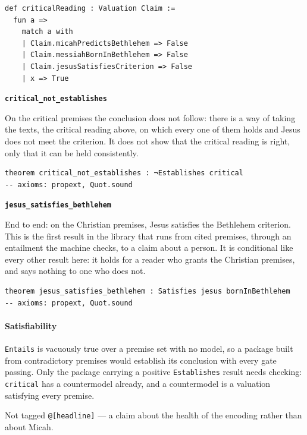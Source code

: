 \documentclass[11pt]{article}
\begin{document}
{\small\begin{verbatim}
def criticalReading : Valuation Claim :=
  fun a =>
    match a with
    | Claim.micahPredictsBethlehem => False
    | Claim.messiahBornInBethlehem => False
    | Claim.jesusSatisfiesCriterion => False
    | x => True
\end{verbatim}}
\par\medskip\noindent\textbf{\texttt{critical\_\allowbreak{}not\_\allowbreak{}establishes}}\par\nobreak\noindent
On the critical premises the conclusion does not follow: there is a way of taking the texts, the critical reading above, on which every one of them holds and Jesus does not meet the criterion. It does not show that the critical reading is right, only that it can be held consistently.

{\small\begin{verbatim}
theorem critical_not_establishes : ¬Establishes critical
-- axioms: propext, Quot.sound
\end{verbatim}}
\par\medskip\noindent\textbf{\texttt{jesus\_\allowbreak{}satisfies\_\allowbreak{}bethlehem}}\par\nobreak\noindent
End to end: on the Christian premises, Jesus satisfies the Bethlehem criterion. This is the first result in the library that runs from cited premises, through an entailment the machine checks, to a claim about a person. It is conditional like every other result here: it holds for a reader who grants the Christian premises, and says nothing to one who does not.

{\small\begin{verbatim}
theorem jesus_satisfies_bethlehem : Satisfies jesus bornInBethlehem
-- axioms: propext, Quot.sound
\end{verbatim}}
\paragraph*{Satisfiability}
\leavevmode\par\nobreak
\texttt{Entails} is vacuously true over a premise set with no model, so a package built from contradictory premises would establish its conclusion with every gate passing. Only the package carrying a positive \texttt{Establishes} result needs checking: \texttt{critical} has a countermodel already, and a countermodel is a valuation satisfying every premise.

Not tagged \texttt{@[headline]} — a claim about the health of the encoding rather than about Micah.
\end{document}
